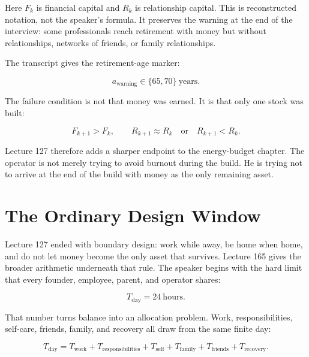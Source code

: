 \documentclass[11pt,oneside]{book}
\begin{document}
Here \(F_k\) is financial capital and \(R_k\) is relationship capital. This is reconstructed notation, not the speaker's formula. It preserves the warning at the end of the interview: some professionals reach retirement with money but without relationships, networks of friends, or family relationships.

The transcript gives the retirement-age marker:

\[
a_{\mathrm{warning}}
\in
\{65,70\}\ \text{years}.
\]

The failure condition is not that money was earned. It is that only one stock was built:

\[
F_{k+1}>F_k,
\qquad
R_{k+1}\approx R_k
\quad
\text{or}
\quad
R_{k+1}<R_k.
\]

Lecture 127 therefore adds a sharper endpoint to the energy-budget chapter. The operator is not merely trying to avoid burnout during the build. He is trying not to arrive at the end of the build with money as the only remaining asset.


\section{The Ordinary Design Window}

Lecture 127 ended with boundary design: work while away, be home when home, and do not let money become the only asset that survives. Lecture 165 gives the broader arithmetic underneath that rule. The speaker begins with the hard limit that every founder, employee, parent, and operator shares:

\[
T_{\mathrm{day}}=24\ \mathrm{hours}.
\]

That number turns balance into an allocation problem. Work, responsibilities, self-care, friends, family, and recovery all draw from the same finite day:

\[
T_{\mathrm{day}}
=
T_{\mathrm{work}}
+
T_{\mathrm{responsibilities}}
+
T_{\mathrm{self}}
+
T_{\mathrm{family}}
+
T_{\mathrm{friends}}
+
T_{\mathrm{recovery}}.
\]
\end{document}
